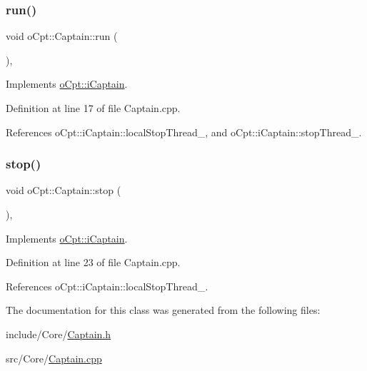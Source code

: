 \hypertarget{classo_cpt_1_1_captain_ade0ca7804340b555a9ead5dd01465045}{}\label{classo_cpt_1_1_captain_ade0ca7804340b555a9ead5dd01465045} 
\subsubsection{\texorpdfstring{run()}{run()}}
{\footnotesize\ttfamily void o\+Cpt\+::\+Captain\+::run (\begin{DoxyParamCaption}{ }\end{DoxyParamCaption})\hspace{0.3cm}{\ttfamily [override]}, {\ttfamily [virtual]}}



Implements \hyperlink{classo_cpt_1_1i_captain_a53d61f2d68b435f32ad66858ae898763}{o\+Cpt\+::i\+Captain}.



Definition at line 17 of file Captain.\+cpp.



References o\+Cpt\+::i\+Captain\+::local\+Stop\+Thread\+\_\+, and o\+Cpt\+::i\+Captain\+::stop\+Thread\+\_\+.

\hypertarget{classo_cpt_1_1_captain_aa8a3923b961f4bc2ebc857895f759711}{}\label{classo_cpt_1_1_captain_aa8a3923b961f4bc2ebc857895f759711} 
\subsubsection{\texorpdfstring{stop()}{stop()}}
{\footnotesize\ttfamily void o\+Cpt\+::\+Captain\+::stop (\begin{DoxyParamCaption}{ }\end{DoxyParamCaption})\hspace{0.3cm}{\ttfamily [override]}, {\ttfamily [virtual]}}



Implements \hyperlink{classo_cpt_1_1i_captain_aeda385ea9a0ee33301dfda05098c836b}{o\+Cpt\+::i\+Captain}.



Definition at line 23 of file Captain.\+cpp.



References o\+Cpt\+::i\+Captain\+::local\+Stop\+Thread\+\_\+.



The documentation for this class was generated from the following files\+:\begin{DoxyCompactItemize}
\item 
include/\+Core/\hyperlink{_captain_8h}{Captain.\+h}\item 
src/\+Core/\hyperlink{_captain_8cpp}{Captain.\+cpp}\end{DoxyCompactItemize}
